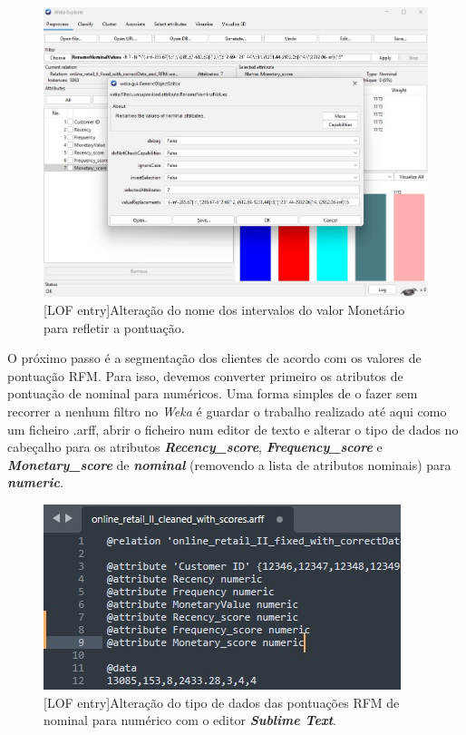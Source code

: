 \documentclass{easychair}
\begin{document}
\begin{figure}[H]
    \begin{centering}
    \includegraphics[width=0.85\linewidth]{imagens/figure11.jpg}\label{cap-3-fig11}
    [LOF entry]{Alteração do nome dos intervalos do valor Monetário para refletir a pontuação.}
    \label{fig11}
    \end{centering}
\end{figure}

O próximo passo é a segmentação dos clientes de acordo com os valores de pontuação RFM. Para isso, devemos converter primeiro os atributos de pontuação de nominal para numéricos. Uma forma simples de o fazer sem recorrer a nenhum filtro no \textit{Weka} é guardar o trabalho realizado até aqui como um ficheiro .arff, abrir o ficheiro num editor de texto e alterar o tipo de dados no cabeçalho para os atributos \textit{\textbf{Recency_score}}, \textit{\textbf{Frequency_score}} e \textit{\textbf{Monetary_score}} de \textit{\textbf{nominal}} (removendo a lista de atributos nominais) para \textit{\textbf{numeric}}.

\begin{figure}[H]
    \begin{centering}
    \includegraphics[width=0.85\linewidth]{imagens/figure15.jpg}\label{cap-3-fig15}
    [LOF entry]{Alteração do tipo de dados das pontuações RFM de nominal para numérico com o editor \textit{\textbf{Sublime Text}}.}
    \label{fig15}
    \end{centering}
\end{figure}
\end{document}
